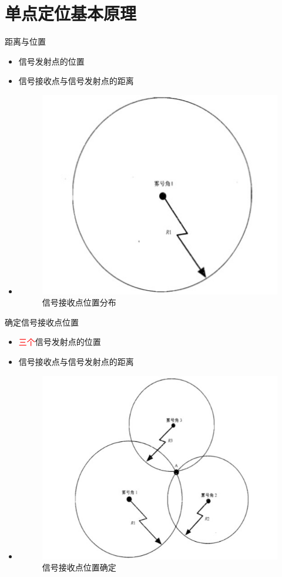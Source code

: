 \section{单点定位基本原理}

\begin{frame}{距离与位置}
    \begin{itemize}[<+-| alert@+>] %
        \item 信号发射点的位置
        \item 信号接收点与信号发射点的距离
        \item[]
        \begin{figure}
            \centering
            \includegraphics[width=.5\textwidth]{pic/signal_distance.jpg}
            \caption{信号接收点位置分布}
            \label{fig:sig_distance}
        \end{figure}
    \end{itemize}
\end{frame}

\begin{frame}{确定信号接收点位置}
    \begin{itemize}
        \item \textcolor{red}{三个}信号发射点的位置
        \item 信号接收点与信号发射点的距离
        \item[]
        \begin{figure}
            \centering
            \includegraphics[width=.5\textwidth]{pic/signal_distance_3.jpg}
            \caption{信号接收点位置确定}
            \label{fig:sig_distance_3}
        \end{figure}
    \end{itemize}
\end{frame}

